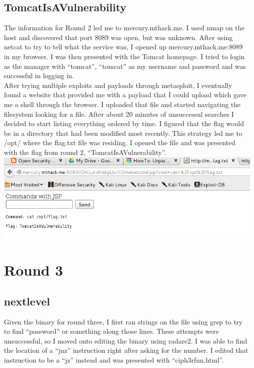 \documentclass[12pt]{report}
\newcommand{\mychapter}[2]{
    \setcounter{chapter}{#1}
    \setcounter{section}{0}
    \chapter*{#2}
    \addcontentsline{toc}{chapter}{#2}
}
\begin{document}
\section{TomcatIsAVulnerability}
The information for Round 2 led me to mercury.mthack.me. I used nmap on the host and discovered that port 8089 was open, but was unknown. After using netcat to try to tell what the service was, I opened up mercury.mthack.me:8089 in my browser. I was then presented with the Tomcat homepage. I tried to login as the manager with ``tomcat'', ``tomcat'' as my username and password and was successful in logging in.\\
After trying multiple exploits and payloads through metasploit, I eventually found a website that provided me with a payload that I could upload which gave me a shell through the browser. I uploaded that file and started navigating the filesystem looking for a file. After about 20 minutes of unsuccessul searches I decided to start listing everything ordered by time. I figured that the flag would be in a directory that had been modified most recently. This strategy led me to /opt/ where the flag.txt file was residing. I opened the file and was presented with the flag from round 2, ``TomcatIsAVulnerability''.\\
\includegraphics[scale=0.33, width=\linewidth]{TomcatIsAVulnerability.png}
\newline


\mychapter{4}{Round 3}
\section{nextlevel}
Given the binary for round three, I first ran strings on the file using grep to try to find ``password'' or something along those lines. These attempts were unsuccessful, so I moved onto editing the binary using radare2. I was able to find the location of a ``jnz'' instruction right after asking for the number. I edited that instruction to be a ``jz'' instead and was presented with ``ciph3rfun.html''.\\
\end{document}
